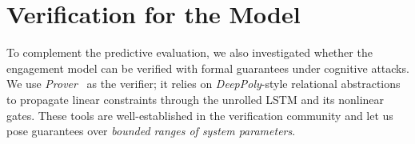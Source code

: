 \documentclass[review]{vgtc}                 %
\begin{document}


\section{Verification for the Model}
\label{sec:verification}

To complement the predictive evaluation, we also investigated whether the engagement model can be verified with formal guarantees under cognitive attacks. We use \emph{Prover}~\cite{prover} as the verifier; it relies on \emph{DeepPoly}-style relational abstractions~\cite{deeppoly} to propagate linear constraints through the unrolled LSTM and its nonlinear gates. These tools are well-established in the verification community and let us pose guarantees over \emph{bounded ranges of system parameters}.
\end{document}
